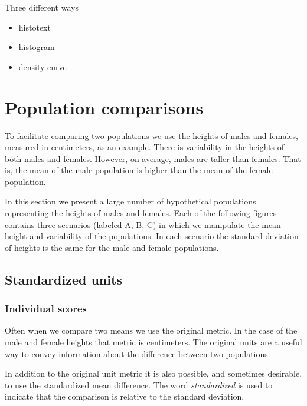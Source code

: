 \documentclass[
]{krantz}
\begin{document}
Three different ways

\begin{itemize}
\item
  histotext
\item
  histogram
\item
  density curve
\end{itemize}

\hypertarget{population-comparisons}{%
\section{Population comparisons}\label{population-comparisons}}

To facilitate comparing two populations we use the heights of males and females, measured in centimeters, as an example. There is variability in the heights of both males and females. However, on average, males are taller than females. That is, the mean of the male population is higher than the mean of the female population.

In this section we present a large number of hypothetical populations representing the heights of males and females. Each of the following figures contains three scenarios (labeled A, B, C) in which we manipulate the mean height and variability of the populations. In each scenario the standard deviation of heights is the same for the male and female populations.

\hypertarget{standardized-units}{%
\subsection{Standardized units}\label{standardized-units}}

\hypertarget{individual-scores}{%
\subsubsection{Individual scores}\label{individual-scores}}

Often when we compare two means we use the original metric. In the case of the male and female heights that metric is centimeters. The original units are a useful way to convey information about the difference between two populations.

In addition to the original unit metric it is also possible, and sometimes desirable, to use the standardized mean difference. The word \emph{standardized} is used to indicate that the comparison is relative to the standard deviation.
\end{document}

